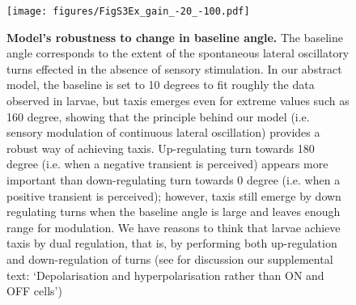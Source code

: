 \begin{figure}
\begin{center}
\texttt{[image: figures/FigS3Ex\_gain\_-20\_-100.pdf]}
\caption{{\bf Model’s robustness to change in baseline angle.}
The baseline angle corresponds to the extent of the spontaneous lateral oscillatory turns effected in the absence of sensory stimulation. In our abstract model, the baseline is set to 10 degrees to fit roughly the data observed in larvae, but taxis emerges even for extreme values such as 160 degree, showing that the principle behind our model (i.e. sensory modulation of continuous lateral oscillation) provides a robust way of achieving taxis. Up-regulating turn towards 180 degree (i.e. when a negative transient is perceived) appears more important than down-regulating turn towards 0 degree (i.e. when a positive transient is perceived); however, taxis still emerge by down regulating turns when the baseline angle is large and leaves enough range for modulation. We have reasons to think that larvae achieve taxis by dual regulation, that is, by performing both up-regulation and down-regulation of turns (see for discussion our supplemental text: ‘Depolarisation and hyperpolarisation rather than ON and OFF cells’)   
\label{fig:FigS1}}
\end{center}
\end{figure}
%
